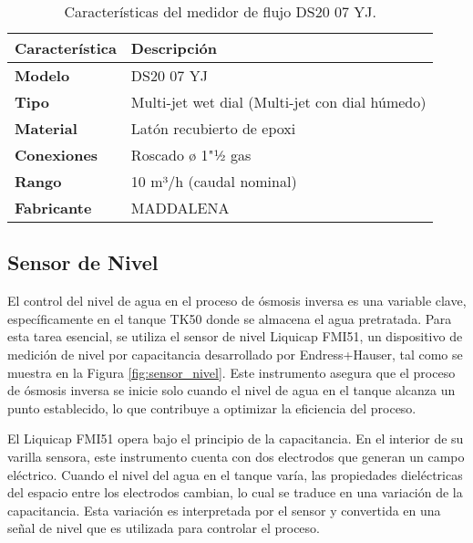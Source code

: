 

\begin{table}[H]
    \centering
    \caption{Características del medidor de flujo DS20 07 YJ.}
    \label{table:sensor_transmisor_flujo2}
    \begin{tabular}{| L{6cm} | L{6cm} |}
        \hline
        \textbf{Característica} & \textbf{Descripción}                           \\
        \hline
        \textbf{Modelo}         & DS20 07 YJ                                     \\
        \hline
        \textbf{Tipo}           & Multi-jet wet dial (Multi-jet con dial húmedo) \\
        \hline
        \textbf{Material}       & Latón recubierto de epoxi                      \\
        \hline
        \textbf{Conexiones}     & Roscado ø 1"½ gas                              \\
        \hline
        \textbf{Rango}          & 10 m³/h (caudal nominal)                       \\
        \hline
        \textbf{Fabricante}     & MADDALENA                                      \\
        \hline
    \end{tabular}
\end{table}



\subsection{Sensor de Nivel}

El control del nivel de agua en el proceso de ósmosis inversa es una variable clave, específicamente en el tanque TK50 donde se almacena el agua pretratada. Para esta tarea esencial, se utiliza el sensor de nivel Liquicap FMI51, un dispositivo de medición de nivel por capacitancia desarrollado por Endress+Hauser, tal como se muestra en la Figura \ref{fig:sensor_nivel}. Este instrumento asegura que el proceso de ósmosis inversa se inicie solo cuando el nivel de agua en el tanque alcanza un punto establecido, lo que contribuye a optimizar la eficiencia del proceso.

El Liquicap FMI51 opera bajo el principio de la capacitancia. En el interior de su varilla sensora, este instrumento cuenta con dos electrodos que generan un campo eléctrico. Cuando el nivel del agua en el tanque varía, las propiedades dieléctricas del espacio entre los electrodos cambian, lo cual se traduce en una variación de la capacitancia. Esta variación es interpretada por el sensor y convertida en una señal de nivel que es utilizada para controlar el proceso.

